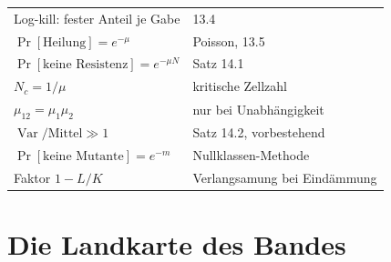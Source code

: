 \begin{merksatz}
\begin{center}
{\small
\renewcommand{\arraystretch}{1.62}
\begin{tabular}{@{}P{4.4cm}P{4.2cm}@{}}
\toprule
Log-kill: fester Anteil je Gabe & 13.4\\
$\Pr[\text{Heilung}] = e^{-\mu}$ & Poisson, 13.5\\
$\Pr[\text{keine Resistenz}] = e^{-\mu N}$ & Satz 14.1\\
$N_c = 1/\mu$ & kritische Zellzahl\\
$\mu_{12} = \mu_1\mu_2$ & nur bei Unabhängigkeit\\
$\operatorname{Var}/\text{Mittel} \gg 1$ & Satz 14.2, vorbestehend\\
$\Pr[\text{keine Mutante}] = e^{-m}$ & Nullklassen-Methode\\
Faktor $1-L/K$ & Verlangsamung bei Eindämmung\\
\bottomrule
\end{tabular}}
\end{center}
\end{merksatz}

\section{Die Landkarte des Bandes}

